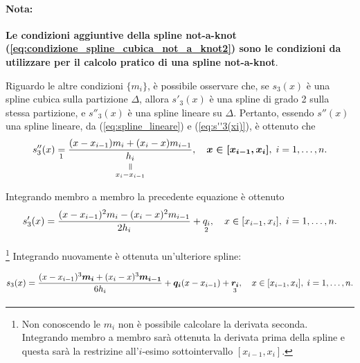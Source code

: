 \paragraph{Nota:} \textbf{Le condizioni aggiuntive della spline not-a-knot (\ref{eq:condizione_spline_cubica_not_a_knot2}) sono le condizioni da utilizzare per il calcolo pratico di una spline not-a-knot}.

Riguardo le altre condizioni $\{m_i\}$, è possibile osservare che, se $s_3(x)$ è una spline cubica sulla partizione $\Delta$, allora $s'_3(x)$ è una spline di grado 2 sulla stessa partizione, e $s''_3(x)$ è una spline lineare su $\Delta$. Pertanto, essendo $s''(x)$ una spline lineare, da (\ref{eq:spline_lineare}) e (\ref{eq:s''3(xi)}), è ottenuto che
\begin{equation*}
    s''_3(x)\underset{\footnotemark}{=}\frac{(x-x_{i-1})m_i+(x_i-x)m_{i-1}}{\equalto{h_i}{x_i-x_{i-1}}},\quad\boldsymbol{x\in[x_{i-1}, x_i]},\; i=1,\hdots,n.
\end{equation*}

Integrando membro a membro la precedente equazione è ottenuto
\begin{equation}\label{eq:s'_3(x)}
    s'_3(x)=\frac{(x-x_{i-1})^2m_i-(x_i-x)^2m_{i-1}}{2h_i}+\underset{\footnotemark}{q_i},\quad x\in [x_{i-1}, x_i],\; i=1,\hdots,n.
\end{equation}

\noindent\footnote{Non conoscendo le $m_i$ non è possibile calcolare la derivata seconda. Integrando membro a membro sarà ottenuta la derivata prima della spline e questa sarà la restrizine all'$i$-esimo sottointervallo $[x_{i-1},x_i]$.}
Integrando nuovamente è ottenuta un'ulteriore spline:

\begin{equation}\label{eq:s3Ign}
    s_3(x)=\frac{(x-x_{i-1})^3\boldsymbol{m_i}+(x_i-x)^3\boldsymbol{m_{i-1}}}{6h_i}+\boldsymbol{q_i}(x-x_{i-1})+\underset{\footnotemark}{\boldsymbol{r_i}},\quad x\in[x_{i-1},x_i],\; i=1,\hdots,n.
\end{equation}

